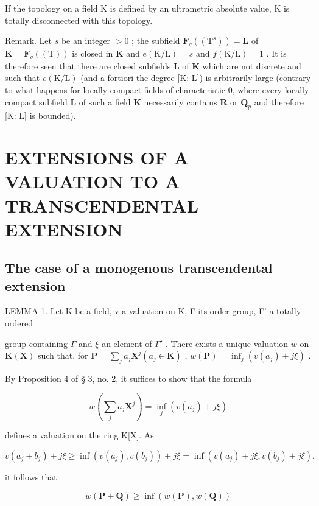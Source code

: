 If the topology on a field K is defined by an ultrametric absolute value, K is totally disconnected with this topology.

Remark. Let \(s\) be an integer \(>0\) ; the subfield \(\mathbf{F}_{q}((\mathrm{T}^{s})) = \mathbf{L}\) of \(\mathbf{K} = \mathbf{F}_{q}((\mathrm{T}))\) is closed in \(\mathbf{K}\) and \(e(\mathrm{K/L}) = s\) and \(f(\mathrm{K/L}) = 1\) . It is therefore seen that there are closed subfields \(\mathbf{L}\) of \(\mathbf{K}\) which are not discrete and such that \(e(\mathrm{K/L})\) (and a fortiori the degree {[}K: L{]}) is arbitrarily large (contrary to what happens for locally compact fields of characteristic 0, where every locally compact subfield \(\mathbf{L}\) of such a field \(\mathbf{K}\) necessarily contains \(\mathbf{R}\) or \(\mathbf{Q}_{p}\) and therefore {[}K: L{]} is bounded).

\section{EXTENSIONS OF A VALUATION TO A TRANSCENDENTAL EXTENSION}

\subsection{The case of a monogenous transcendental extension}

LEMMA 1. Let K be a field, v a valuation on K, Γ its order group, Γ' a totally ordered

group containing \(\Gamma\) and \(\xi\) an element of \(\Gamma'\) . There exists a unique valuation \(w\) on \(\mathbf{K}(\mathbf{X})\) such that, for \(\mathbf{P} = \sum_{j} a_j \mathbf{X}^j (a_j \in \mathbf{K})\) , \(w(\mathbf{P}) = \inf_j(v(a_j) + j\xi)\) .

By Proposition 4 of § 3, no. 2, it suffices to show that the formula

\[
w \left(\sum_ {j} a _ {j} \mathbf {X} ^ {j}\right) = \inf _ {j} (v (a _ {j}) + j \xi)\tag{1}
\]

defines a valuation on the ring K{[}X{]}. As

\[
v \left(a _ {j} + b _ {j}\right) + j \xi \geqslant \inf (v \left(a _ {j}\right), v \left(b _ {j}\right)) + j \xi = \inf (v \left(a _ {j}\right) + j \xi , v \left(b _ {j}\right) + j \xi),
\]

it follows that

\[
w (\mathbf {P} + \mathbf {Q}) \geqslant \inf (w (\mathbf {P}), w (\mathbf {Q}))\tag{2}
\]

